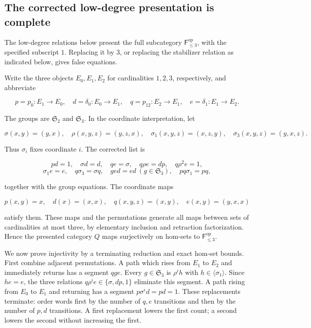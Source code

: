 \documentclass[11pt,a4paper]{article}
\theoremstyle{definition}
\begin{document}
\subsection{The corrected low-degree presentation is
complete}\label{b6.3.-the-corrected-low-degree-presentation-is-complete}

The low-degree relations below
present the full subcategory \(\mathsf F_{\le3}^{\mathrm{op}}\),
with the specified subscript \(1\). Replacing it by \(3\), or replacing the stabilizer relation as indicated below, gives false equations.

Write the three objects \(E_0,E_1,E_2\) for cardinalities \(1,2,3\),
respectively, and abbreviate

\[p=p_0:E_1\to E_0,\quad d=\delta_0:E_0\to E_1,
\quad q=p_{12}:E_2\to E_1,\quad e=\delta_1:E_1\to E_2.\]

The groups are \(\mathfrak S_2\) and \(\mathfrak S_3\). In the
coordinate interpretation, let

\[\sigma(x,y)=(y,x),\quad \rho(x,y,z)=(y,z,x),
\quad\sigma_1(x,y,z)=(x,z,y),\quad\sigma_3(x,y,z)=(y,x,z).\]

Thus \(\sigma_i\) fixes coordinate \(i\). The corrected list is

\[pd=1,\quad \sigma d=d,\quad qe=\sigma,\quad q\rho e=dp,
\quad q\rho^2e=1,\]
\[\sigma_1e=e,\quad q\sigma_3=\sigma q,\quad ged=ed\ (g\in\mathfrak S_3),
\quad pq\sigma_1=pq,\]

together with the group equations. The coordinate maps

\[p(x,y)=x,\quad d(x)=(x,x),\quad q(x,y,z)=(x,y),\quad e(x,y)=(y,x,x)\]

satisfy them. These maps and the permutations generate all maps between
sets of cardinalities at most three, by elementary inclusion and
retraction factorization. Hence the presented category \(Q\) maps
surjectively on hom-sets to \(\mathsf F_{\le3}^{\mathrm{op}}\).

We now prove injectivity by a terminating reduction and exact hom-set
bounds. First combine adjacent permutations. A path which rises from
\(E_1\) to \(E_2\) and immediately returns has a segment \(qge\). Every
\(g\in\mathfrak S_3\) is \(\rho^i h\) with
\(h\in\langle\sigma_1\rangle\). Since \(he=e\), the three relations
\(q\rho^ie\in\{\sigma,dp,1\}\) eliminate this segment. A path rising
from \(E_0\) to \(E_1\) and returning has a segment
\(p\sigma^\epsilon d=p d=1\). These replacements terminate: order words
first by the number of \(q,e\) transitions and then by the number of
\(p,d\) transitions. A first replacement lowers the first count; a
second lowers the second without increasing the first.
\end{document}
